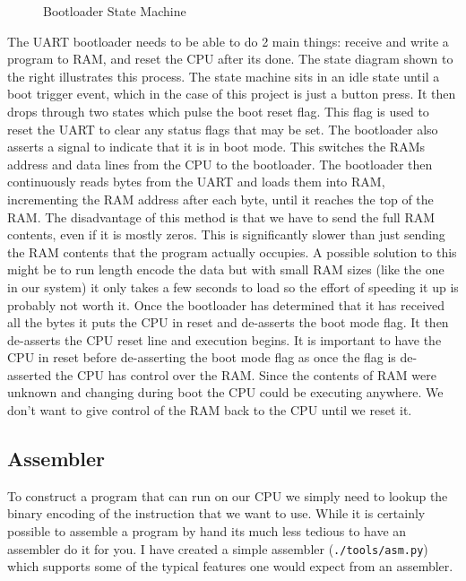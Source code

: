 \documentclass[10pt]{article}
\begin{document}
\begin{figure}[H]
\begin{minipage}[t]{.4\textwidth}
                \caption{Bootloader State Machine}
            \end{minipage}
        \end{figure}

        The UART bootloader needs to be able to do 2 main things: receive and
        write a program to RAM, and reset the CPU after its done. The state
        diagram shown to the right illustrates this process. The state machine
        sits in an idle state until a boot trigger event, which in the case of
        this project is just a button press. It then drops through two states
        which pulse the boot reset flag. This flag is used to reset the UART to
        clear any status flags that may be set. The bootloader also asserts a
        signal to indicate that it is in boot mode. This switches the RAMs
        address and data lines from the CPU to the bootloader. The bootloader
        then continuously reads bytes from the UART and loads them into RAM,
        incrementing the RAM address after each byte, until it reaches the top
        of the RAM. The disadvantage of this method is that we have to send the
        full RAM contents, even if it is mostly zeros. This is significantly
        slower than just sending the RAM contents that the program actually
        occupies.  A possible solution to this might be to run length encode
        the data but with small RAM sizes (like the one in our system) it only
        takes a few seconds to load so the effort of speeding it up is probably
        not worth it. Once the bootloader has determined that it has received
        all the bytes it puts the CPU in reset and de-asserts the boot mode
        flag. It then de-asserts the CPU reset line and execution begins. It is
        important to have the CPU in reset before de-asserting the boot mode
        flag as once the flag is de-asserted the CPU has control over the RAM.
        Since the contents of RAM were unknown and changing during boot the CPU
        could be executing anywhere. We don't want to give control of the RAM
        back to the CPU until we reset it.


    \newpage
    \subsection{Assembler}

    To construct a program that can run on our CPU we simply need to lookup the
    binary encoding of the instruction that we want to use. While it is
    certainly possible to assemble a program by hand its much less tedious to
    have an assembler do it for you. I have created a simple assembler
    (\texttt{./tools/asm.py}) which supports some of the typical features one
    would expect from an assembler.
\end{document}
